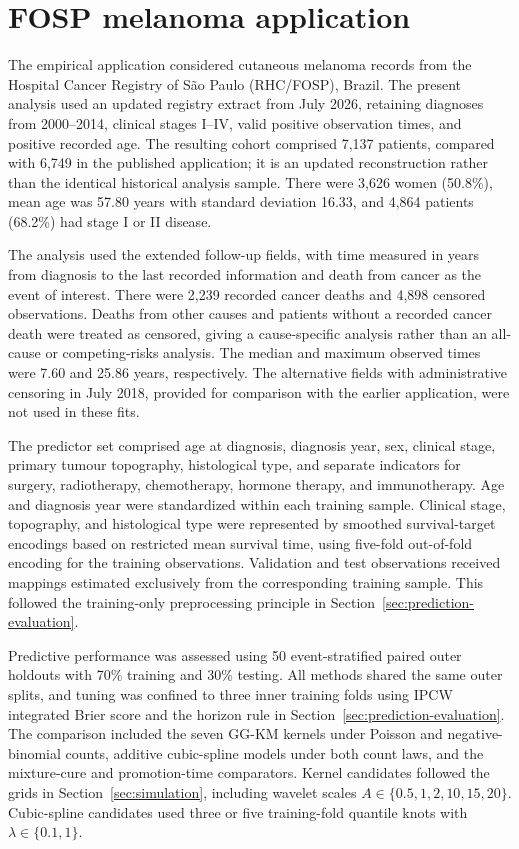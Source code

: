 \section{FOSP melanoma application}\label{sec:fosp-melanoma}

The empirical application considered cutaneous melanoma records from
the Hospital Cancer Registry of S\~ao Paulo (RHC/FOSP), Brazil. The present analysis used
an updated registry extract from July 2026, retaining diagnoses from
2000--2014, clinical stages I--IV, valid positive observation times, and
positive recorded age. The resulting cohort comprised 7,137 patients,
compared with 6,749 in the published application; it is an updated
reconstruction rather than the identical historical analysis sample.
There were 3,626 women (50.8\%), mean age was 57.80 years with standard
deviation 16.33, and 4,864 patients (68.2\%) had stage I or II disease.

The analysis used the extended follow-up fields, with time measured in
years from diagnosis to the last recorded information and death from
cancer as the event of interest. There were 2,239 recorded cancer deaths
and 4,898 censored observations. Deaths from other causes and patients
without a recorded cancer death were treated as censored, giving a
cause-specific analysis rather than an all-cause or competing-risks
analysis. The median and maximum observed times were 7.60 and 25.86 years,
respectively. The alternative fields with administrative censoring in
July 2018, provided for comparison with the earlier application, were not
used in these fits.

The predictor set comprised age at diagnosis, diagnosis year, sex,
clinical stage, primary tumour topography, histological type, and separate
indicators for surgery, radiotherapy, chemotherapy, hormone therapy, and
immunotherapy. Age and diagnosis year were standardized within each
training sample. Clinical stage, topography, and histological type were
represented by smoothed survival-target encodings based on restricted
mean survival time, using five-fold out-of-fold encoding for the training
observations. Validation and test observations received mappings
estimated exclusively from the corresponding training sample. This
followed the training-only preprocessing principle in
Section~\ref{sec:prediction-evaluation}.

Predictive performance was assessed using 50 event-stratified paired
outer holdouts with 70\% training and 30\% testing. All methods shared
the same outer splits, and tuning was confined to three inner training
folds using IPCW integrated Brier score and the horizon rule in
Section~\ref{sec:prediction-evaluation}. The comparison included the seven
GG-KM kernels under Poisson and negative-binomial counts, additive
cubic-spline models under both count laws, and the mixture-cure and
promotion-time comparators. Kernel candidates followed the grids in
Section~\ref{sec:simulation}, including wavelet scales
$A\in\{0.5,1,2,10,15,20\}$. Cubic-spline candidates used three or five
training-fold quantile knots with
$\lambda\in\{0.1,1\}$.

